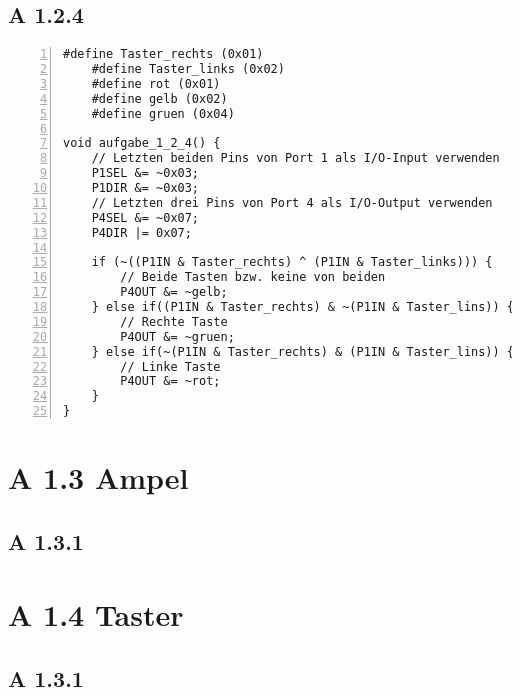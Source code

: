 \documentclass[11pt,a4paper,ngerman]{article}
\begin{document}
\subsection*{A 1.2.4}

\begin{lstlisting}[numbers=left]
	#define Taster_rechts (0x01)
	#define Taster_links (0x02)
	#define rot (0x01)
	#define gelb (0x02)
	#define gruen (0x04)
	
void aufgabe_1_2_4() {
	// Letzten beiden Pins von Port 1 als I/O-Input verwenden
	P1SEL &= ~0x03;
	P1DIR &= ~0x03;
	// Letzten drei Pins von Port 4 als I/O-Output verwenden
	P4SEL &= ~0x07;
	P4DIR |= 0x07;
	
	if (~((P1IN & Taster_rechts) ^ (P1IN & Taster_links))) {
		// Beide Tasten bzw. keine von beiden
		P4OUT &= ~gelb;
	} else if((P1IN & Taster_rechts) & ~(P1IN & Taster_lins)) {
		// Rechte Taste
		P4OUT &= ~gruen;
	} else if(~(P1IN & Taster_rechts) & (P1IN & Taster_lins)) {
		// Linke Taste
		P4OUT &= ~rot;
	}
}
\end{lstlisting}

\section*{A 1.3 Ampel}
\subsection*{A 1.3.1}
\section*{A 1.4 Taster}
\subsection*{A 1.3.1}
\label{LastPage}
\end{document}
